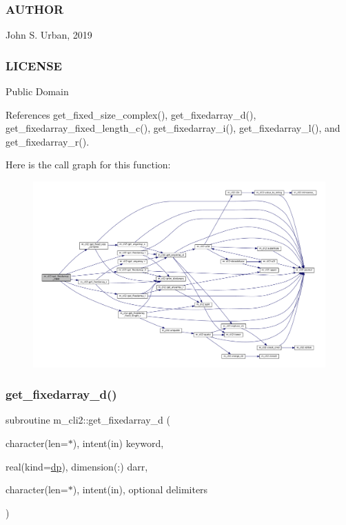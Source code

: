 \subsubsection*{A\+U\+T\+H\+OR}

John S. Urban, 2019 \subsubsection*{L\+I\+C\+E\+N\+SE}

Public Domain 

References get\+\_\+fixed\+\_\+size\+\_\+complex(), get\+\_\+fixedarray\+\_\+d(), get\+\_\+fixedarray\+\_\+fixed\+\_\+length\+\_\+c(), get\+\_\+fixedarray\+\_\+i(), get\+\_\+fixedarray\+\_\+l(), and get\+\_\+fixedarray\+\_\+r().

Here is the call graph for this function\+:\nopagebreak
\begin{figure}[H]
\begin{center}
\leavevmode
\includegraphics[width=350pt]{namespacem__cli2_a6d8c1c441ac15f9a2882e50459d39565_cgraph}
\end{center}
\end{figure}
\mbox{\label{namespacem__cli2_a2c8db0f383888cb2b3ce8643de3fae93}} 
\subsubsection{\texorpdfstring{get\+\_\+fixedarray\+\_\+d()}{get\_fixedarray\_d()}}
{\footnotesize\ttfamily subroutine m\+\_\+cli2\+::get\+\_\+fixedarray\+\_\+d (\begin{DoxyParamCaption}\item[{character(len=$\ast$), intent(in)}]{keyword,  }\item[{real(kind=\mbox{\hyperlink{namespacem__cli2_acf83f1963cf6a56ad0221cfcf5402440}{dp}}), dimension(\+:)}]{darr,  }\item[{character(len=$\ast$), intent(in), optional}]{delimiters }\end{DoxyParamCaption})\hspace{0.3cm}{\ttfamily [private]}}



